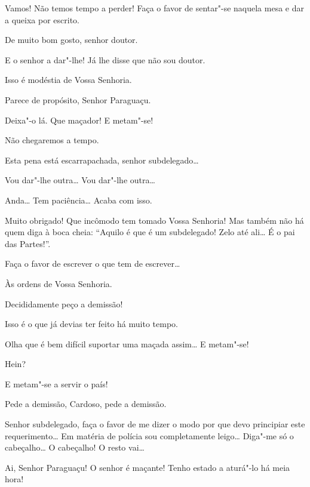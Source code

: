 \begin{linenumbers}
 Vamos! Não temos tempo a perder! Faça o favor de sentar"-se
naquela mesa e dar a queixa por
escrito.

 De muito bom gosto, senhor doutor. 

 E o senhor a dar"-lhe! Já lhe disse que não sou doutor.

 Isso é modéstia de Vossa Senhoria.

 Parece de propósito, Senhor Paraguaçu.

 Deixa"-o lá.  Que
maçador! E metam"-se!

 Não chegaremos a tempo.

  Esta pena está escarrapachada, senhor
subdelegado\ldots{}

 Vou dar"-lhe outra\ldots{} Vou dar"-lhe outra\ldots{}

 Anda\ldots{} Tem paciência\ldots{} Acaba com isso. 

 Muito obrigado! Que incômodo tem tomado Vossa Senhoria! Mas
também não há quem diga à
boca cheia: “Aquilo é que é um subdelegado! Zelo até ali\ldots{} É o pai das
Partes!”.

 Faça o favor de escrever o que tem de escrever\ldots{}

 Às ordens de Vossa Senhoria. 

  Decididamente peço
a demissão!

 Isso é o que já devias ter feito há muito tempo.

 Olha que é bem difícil suportar uma maçada assim\ldots{} E
metam"-se!

 Hein?

 E metam"-se a servir o país!

 Pede a demissão, Cardoso, pede a demissão.

  Senhor subdelegado, faça o favor de
me dizer o modo por que devo principiar este
requerimento\ldots{} Em matéria de polícia sou completamente leigo\ldots{} Diga"-me
só o cabeçalho\ldots{} O cabeçalho!
O resto vai\ldots{}

 Ai, Senhor Paraguaçu! O senhor é maçante! Tenho estado a
aturá"-lo há meia hora!


\end{linenumbers}

